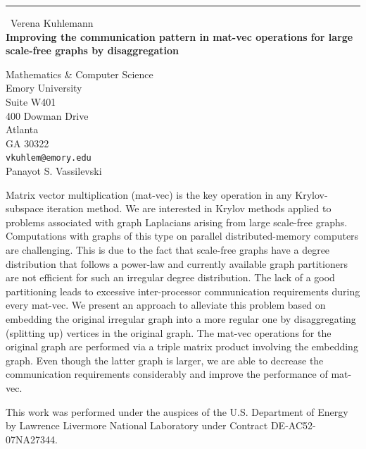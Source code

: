 \documentclass{report}
\begin{document}
\begin{center}
\rule{6in}{1pt} \
{\large Verena Kuhlemann \\
{\bf Improving the communication pattern in mat-vec operations for large scale-free graphs by disaggregation}}

Mathematics & Computer Science \\ Emory University \\ Suite W401 \\ 400 Dowman Drive \\ Atlanta \\ GA 30322
\\
{\tt vkuhlem@emory.edu}\\
Panayot S. Vassilevski\end{center}

Matrix vector multiplication (mat-vec) is the key operation in any
Krylov-subspace iteration method. We are interested in Krylov methods
applied to problems associated
with graph Laplacians arising from large scale-free graphs. Computations
with graphs of this type on parallel distributed-memory computers are
challenging. This is due to the fact that scale-free graphs have a degree
distribution that follows a power-law and currently available graph
partitioners are not efficient for such an irregular degree distribution.
The lack of a good partitioning leads to excessive inter-processor
communication requirements during every mat-vec. We present an approach
to alleviate this problem based on embedding the original irregular graph
into a more regular one by disaggregating (splitting up) vertices in the
original graph. The mat-vec operations for the original graph are
performed via a triple matrix product involving the embedding graph. Even
though the latter graph is larger, we are able to decrease the
communication requirements considerably and improve the performance of
mat-vec.

This work was performed under the auspices of the U.S. Department of
Energy by Lawrence Livermore National Laboratory under Contract DE-AC52-07NA27344.
\end{document}
